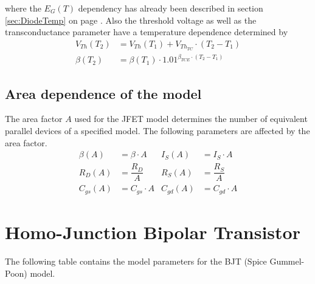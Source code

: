 where the $E_G\left(T\right)$ dependency has already been described in
section \ref{sec:DiodeTemp} on page \pageref{sec:DiodeTemp}.  Also the
threshold voltage as well as the transconductance parameter have a
temperature dependence determined by
\begin{align}
V_{Th}\left(T_2\right) &= V_{Th}\left(T_1\right) + V_{Th_{TC}}\cdot\left(T_2 - T_1\right)\\
\beta\left(T_2\right) &= \beta\left(T_1\right)\cdot 1.01^{\beta_{TCE}\cdot\left(T_2 - T_1\right)}
\end{align}

\subsection{Area dependence of the model}

The area factor $A$ used for the JFET model determines the number of
equivalent parallel devices of a specified model.  The following
parameters are affected by the area factor.
\begin{align}
\beta\left(A\right) &= \beta\cdot A & I_S\left(A\right) &= I_S\cdot A\\
R_D\left(A\right) &= \dfrac{R_D}{A} & R_S\left(A\right) &= \dfrac{R_S}{A}\\
C_{gs}\left(A\right) &= C_{gs}\cdot A & C_{gd}\left(A\right) &= C_{gd}\cdot A
\end{align}

\section{Homo-Junction Bipolar Transistor}

The following table contains the model parameters for the BJT (Spice
Gummel-Poon) model.

\addvspace{12pt}

